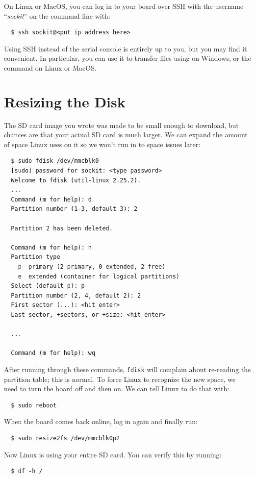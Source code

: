 \documentclass{sockitguide}
\begin{document}
On Linux or MacOS, you can log in to your board over SSH with the
username ``\textit{sockit}'' on the command line with:
\begin{verbatim}
  $ ssh sockit@<put ip address here>
\end{verbatim}

Using SSH instead of the serial console is entirely up to you, but you
may find it convenient. In particular, you can use it to transfer
files using  on
Windows, or the 
command on Linux or MacOS.

\section{Resizing the Disk}

The SD card image you wrote was made to be small enough to download,
but chances are that your actual SD card is much larger. We can expand
the amount of space Linux uses on it so we won't run in to space
issues later:
\begin{verbatim}
  $ sudo fdisk /dev/mmcblk0
  [sudo] password for sockit: <type password>
  Welcome to fdisk (util-linux 2.25.2).
  ...
  Command (m for help): d
  Partition number (1-3, default 3): 2

  Partition 2 has been deleted.

  Command (m for help): n
  Partition type
    p  primary (2 primary, 0 extended, 2 free)
    e  extended (container for logical partitions)
  Select (default p): p
  Partition number (2, 4, default 2): 2
  First sector (...): <hit enter>
  Last sector, +sectors, or +size: <hit enter>

  ...

  Command (m for help): wq
\end{verbatim}

After running through these commands, \texttt{fdisk} will complain
about re-reading the partition table; this is normal. To force Linux
to recognize the new space, we need to turn the board off and then
on. We can tell Linux to do that with:
\begin{verbatim}
  $ sudo reboot
\end{verbatim}

When the board comes back online, log in again and finally run:
\begin{verbatim}
  $ sudo resize2fs /dev/mmcblk0p2
\end{verbatim}

Now Linux is using your entire SD card. You can verify this by running:
\begin{verbatim}
  $ df -h /
\end{verbatim}
\end{document}
